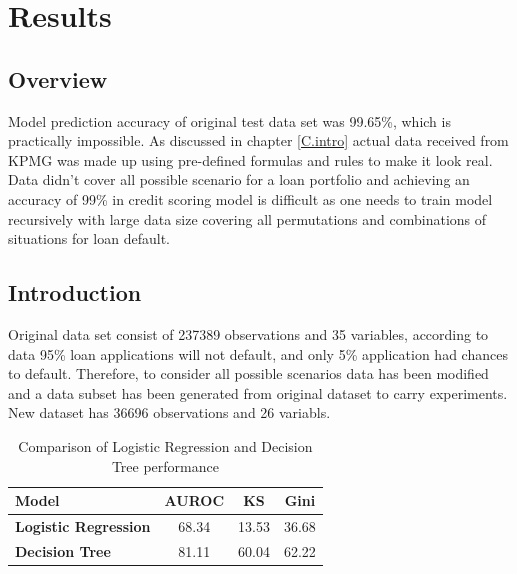 %
%
%
%

\chapter{Results}\label{C.Results}

\section{Overview}
Model prediction accuracy of original test data set was 99.65\%, which is practically impossible. As discussed in chapter \ref{C.intro} actual data received from KPMG was made up using pre-defined formulas and rules to make it look real. Data didn't cover all possible scenario for a loan portfolio and achieving an accuracy of 99\% in credit scoring model is difficult as one needs to train model recursively with large data size covering all permutations and combinations of situations for loan default.


\section{Introduction}\label{S.intro5}

Original data set consist of 237389 observations and 35 variables, according to data 95\% loan applications will not default, and only 5\% application had chances to default. Therefore, to consider all possible scenarios data has been modified and a data subset has been generated from original dataset to carry experiments. New dataset has 36696 observations and 26 variabls. 

\begin{table}[]
\centering
\caption{Comparison of Logistic Regression and Decision Tree performance}
\label{table:results}
\begin{tabular}{@{}lccc@{}}
\toprule
\textbf{Model}               & \textbf{AUROC} & \textbf{KS} & \textbf{Gini} \\ \midrule
\textbf{Logistic Regression} & 68.34          & 13.53       & 36.68         \\
\textbf{Decision Tree}       & 81.11          & 60.04       & 62.22         \\ \bottomrule
\end{tabular}
\end{table}


